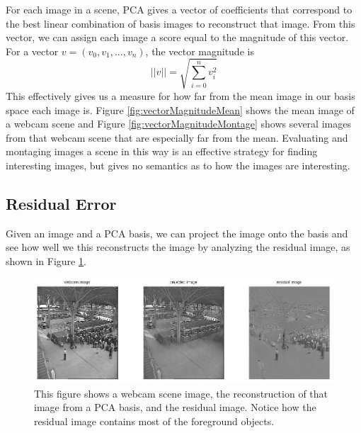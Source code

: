 For each image in a scene, PCA gives a vector of coefficients that correspond to the best linear combination of basis images to reconstruct that image.  From this vector, we can assign each image a score equal to the magnitude of this vector.  For a vector $v = (v_0, v_1, ..., v_n)$, the vector magnitude is $$||v||=\sqrt{\sum_{i=0}^nv_i^2}$$This effectively gives us a measure for how far from the mean image in our basis space each image is.  Figure \ref{fig:vectorMagnitudeMean} shows the mean image of a webcam scene and Figure \ref{fig:vectorMagnitudeMontage} shows several images from that webcam scene that are especially far from the mean.  Evaluating and montaging images a scene in this way is an effective strategy for finding interesting images, but gives no semantics as to how the images are interesting.

\subsection{Residual Error}

Given an image and a PCA basis, we can project the image onto the basis and see how well we this reconstructs the image by analyzing the residual image, as shown in Figure \ref{fig:residualReconstruction}.

\begin{figure}[h!]
	\centering
		\includegraphics[width=1\textwidth]{figures/residualReconstruction.jpg}
	
		\caption[The reconstruction and residual of an image.]{This figure shows a webcam scene image, the reconstruction of that image from a PCA basis, and the residual image.  Notice how the residual image contains most of the foreground objects.}
		
	\label{fig:residualReconstruction}
\end{figure}


